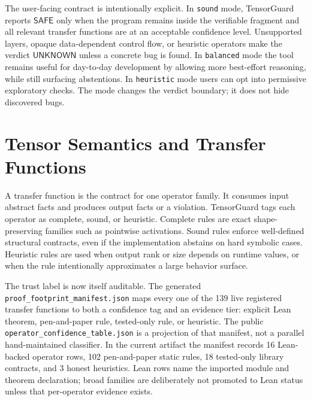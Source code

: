 \documentclass[11pt]{article}
\newcommand{\tg}{TensorGuard}
\newcommand{\unknown}{\ensuremath{\mathsf{UNKNOWN}}}
\newcommand{\safe}{\ensuremath{\mathsf{SAFE}}}
\begin{document}
The user-facing contract is intentionally explicit.  In \texttt{sound} mode,
\tg{} reports \safe{} only when the program remains inside the verifiable
fragment and all relevant transfer functions are at an acceptable confidence
level.  Unsupported layers, opaque data-dependent control flow, or heuristic
operators make the verdict \unknown{} unless a concrete bug is found.  In
\texttt{balanced} mode the tool remains useful for day-to-day development by
allowing more best-effort reasoning, while still surfacing abstentions.  In
\texttt{heuristic} mode users can opt into permissive exploratory checks.
The mode changes the verdict boundary; it does not hide discovered bugs.

\clearpage

\section{Tensor Semantics and Transfer Functions}

A transfer function is the contract for one operator family.  It consumes input
abstract facts and produces output facts or a violation.  \tg{} tags each
operator as complete, sound, or heuristic.  Complete rules are exact
shape-preserving families such as pointwise activations.  Sound rules enforce
well-defined structural contracts, even if the implementation abstains on hard
symbolic cases.  Heuristic rules are used when output rank or size depends on
runtime values, or when the rule intentionally approximates a large behavior
surface.

The trust label is now itself auditable.  The generated
\texttt{proof\_footprint\_manifest.json} maps every one of the 139 live
registered transfer functions to both a confidence tag and an evidence tier:
explicit Lean theorem, pen-and-paper rule, tested-only rule, or heuristic.  The
public \texttt{operator\_confidence\_table.json} is a projection of that manifest,
not a parallel hand-maintained classifier.  In the current artifact the manifest
records 16 Lean-backed operator rows, 102 pen-and-paper static rules, 18
tested-only library contracts, and 3 honest heuristics.  Lean rows name the
imported module and theorem declaration; broad families are deliberately not
promoted to Lean status unless that per-operator evidence exists.
\end{document}
